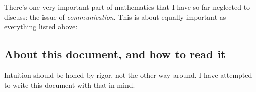 \documentclass[10pt]{article}
\theoremstyle{definition}
\begin{document}
There's one very important part of mathematics that I have so far neglected to discuss: the issue of \emph{communication}.  This is about equally important as everything listed above: 

\subsection{About this document, and how to read it}
Intuition should be honed by rigor, not the other way around.  I have attempted to write this document with that in mind.  
\clearpage
\end{document}
